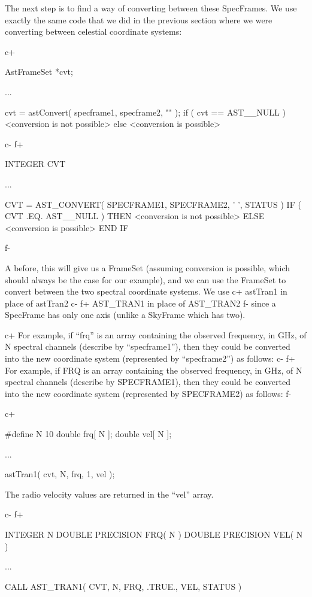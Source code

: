 \documentclass[twoside,11pt]{starlink}
\begin{document}
The next step is to find a way of converting between these SpecFrames. We
use exactly the same code that we did in the previous section where we were
converting between celestial coordinate systems:

c+
\small
\begin{terminalv}
AstFrameSet *cvt;

...

cvt = astConvert( specframe1, specframe2, "" );
if ( cvt == AST__NULL ) {
   <conversion is not possible>
} else {
   <conversion is possible>
}
\end{terminalv}
\normalsize
c-
f+
\small
\begin{terminalv}
      INTEGER CVT

      ...

      CVT = AST_CONVERT( SPECFRAME1, SPECFRAME2, ' ', STATUS )
      IF ( CVT .EQ. AST__NULL ) THEN
         <conversion is not possible>
      ELSE
         <conversion is possible>
      END IF
\end{terminalv}
\normalsize
f-

A before, this will give us a FrameSet (assuming conversion is possible,
which should always be the case for our example), and we can use the
FrameSet to convert between the two spectral coordinate systems. We use
c+
astTran1 in place of astTran2
c-
f+
AST\_TRAN1 in place of AST\_TRAN2
f-
since a SpecFrame has only one axis (unlike a SkyFrame which has two).

c+
For example, if ``frq'' is an array containing the observed frequency, in
GHz, of N spectral channels (describe by ``specframe1''), then they
could be converted into the new coordinate system (represented by
``specframe2'') as follows:
c-
f+
For example, if FRQ is an array containing the observed frequency, in
GHz, of N spectral channels (describe by SPECFRAME1), then they
could be converted into the new coordinate system (represented by
SPECFRAME2) as follows:
f-

c+
\small
\begin{terminalv}
#define N 10
double frq[ N ];
double vel[ N ];

...

astTran1( cvt, N, frq, 1, vel );
\end{terminalv}
\normalsize

The radio velocity values are returned in the ``vel'' array.

c-
f+
\small
\begin{terminalv}
      INTEGER N
      DOUBLE PRECISION FRQ( N )
      DOUBLE PRECISION VEL( N )

      ...

      CALL AST_TRAN1( CVT, N, FRQ, .TRUE., VEL, STATUS )
\end{terminalv}
\normalsize
\end{document}
